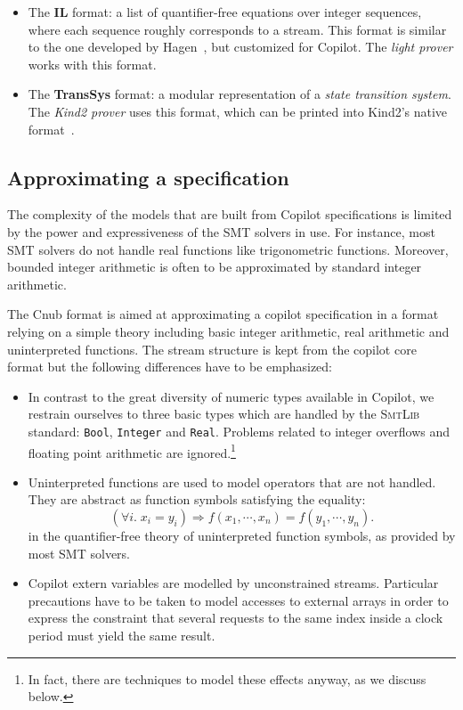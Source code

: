 \begin{itemize}
\item
  The \textbf{IL} format: a list
  of quantifier-free equations over integer sequences, where each sequence
  roughly corresponds to a stream.   This
format is similar to the one developed by Hagen~\cite{HagenPhD}, but customized for Copilot.   The \emph{light prover} works with this
  format.
\item The \textbf{TransSys} format: a modular representation of a
  \emph{state transition system}. The \emph{Kind2 prover} uses this
  format, which can be printed into Kind2's native format~\cite{kind}.
\end{itemize}

\subsection{Approximating a specification}


The complexity of the models that are built from Copilot specifications is
limited by the power and expressiveness of the SMT solvers in use. For instance,
most SMT solvers do not handle real functions like trigonometric functions. Moreover, bounded integer arithmetic is often to be approximated by standard integer arithmetic.

The {Cnub} format is aimed at approximating a copilot specification in a format relying on a simple theory including basic integer arithmetic, real arithmetic and uninterpreted functions. The stream structure is kept from the copilot core format but the following differences have to be emphasized:

\begin{itemize}
\item In contrast to the great diversity of numeric types available in Copilot, we restrain ourselves to three basic types which are handled by the \textsc{SmtLib} standard: \texttt{Bool}, \texttt{Integer} and \texttt{Real}. Problems related to integer overflows and floating point arithmetic are ignored.\footnote{In fact, there are techniques to model these effects anyway, as we discuss below.}


\item {Uninterpreted functions} are used to model operators that are not
  handled. They are abstract as function symbols satisfying the
  equality: $$ \left( \forall i . \; x_i = y_i \right) \Longrightarrow f(x_1,
  \cdots, x_n) = f(y_1, \cdots, y_n). $$ in the quantifier-free theory of
  uninterpreted function symbols, as provided by most SMT solvers.

\item Copilot extern variables are modelled by unconstrained streams. Particular precautions have to be taken to model accesses to external arrays in order to express the constraint that several requests to the same index inside a clock period must yield the same result.

\end{itemize}

